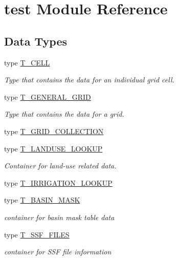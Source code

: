 \hypertarget{namespacetest}{
\section{test Module Reference}
\label{namespacetest}
}
\subsection*{Data Types}
\begin{DoxyCompactItemize}
\item 
type \hyperlink{typetest_1_1_t___c_e_l_l}{T\_\-CELL}
\begin{DoxyCompactList}\small\item\em Type that contains the data for an individual grid cell. \item\end{DoxyCompactList}\item 
type \hyperlink{typetest_1_1_t___g_e_n_e_r_a_l___g_r_i_d}{T\_\-GENERAL\_\-GRID}
\begin{DoxyCompactList}\small\item\em Type that contains the data for a grid. \item\end{DoxyCompactList}\item 
type \hyperlink{typetest_1_1_t___g_r_i_d___c_o_l_l_e_c_t_i_o_n}{T\_\-GRID\_\-COLLECTION}
\item 
type \hyperlink{typetest_1_1_t___l_a_n_d_u_s_e___l_o_o_k_u_p}{T\_\-LANDUSE\_\-LOOKUP}
\begin{DoxyCompactList}\small\item\em Container for land-\/use related data. \item\end{DoxyCompactList}\item 
type \hyperlink{typetest_1_1_t___i_r_r_i_g_a_t_i_o_n___l_o_o_k_u_p}{T\_\-IRRIGATION\_\-LOOKUP}
\item 
type \hyperlink{typetest_1_1_t___b_a_s_i_n___m_a_s_k}{T\_\-BASIN\_\-MASK}
\begin{DoxyCompactList}\small\item\em container for basin mask table data \item\end{DoxyCompactList}\item 
type \hyperlink{typetest_1_1_t___s_s_f___f_i_l_e_s}{T\_\-SSF\_\-FILES}
\begin{DoxyCompactList}\small\item\em container for SSF file information \item\end{DoxyCompactList}\item 

\end{DoxyCompactItemize}
